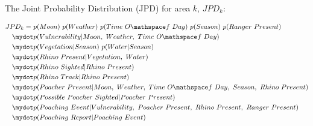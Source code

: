 The Joint Probability Distribution (JPD) for area $k$, $JPD_k$:

\begin{equation} \label{eq:app-monsterequationoriginal}
	\begin{aligned}
	JPD_k =\ & p(Moon)\ p(Weather)\ p(Time\ O\mathspace f\ Day)\ p(Season)\ p(Ranger\ Present)\\ 
	\mydot& p(Vulnerability | Moon,\ Weather,\ Time\ O\mathspace f\ Day)\\
	\mydot& p(Vegetation | Season)\ p(Water | Season)\\
	\mydot& p(Rhino\ Present|Vegetation,\ Water)\\
	\mydot& p(Rhino\ Sighted|Rhino\ Present)\\
	\mydot& p(Rhino\ Track|Rhino\ Present)\\
	\mydot& p(Poacher\ Present|Moon,\ Weather,\ Time\ O\mathspace f\ Day,\ Season,\ Rhino\ Present)\\
	\mydot& p(Possible\ Poacher\ Sighted|Poacher\ Present)\\
	\mydot& p(Poaching\ Event|Vulnerability,\ Poacher\ Present,\ Rhino\ Present,\ Ranger\ Present)\\
	\mydot& p(Poaching\ Report|Poaching\ Event)\\
	\end{aligned}
\end{equation}

